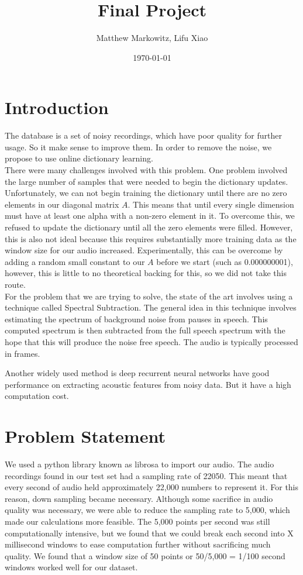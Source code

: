 \documentclass[UTF8]{article}
\title{Final Project}
\author{Matthew Markowitz, Lifu Xiao}
\date{\today}
\begin{document}
\maketitle


\section{Introduction}
The database is a set of noisy recordings, which have poor quality for further usage. So it make sense  to improve them. In order to remove the noise, we propose to use online dictionary learning.\\

There were many challenges involved with this problem. One problem involved the large number of samples that were needed to begin the dictionary updates. Unfortunately, we can not begin training the dictionary until there are no zero elements in our diagonal matrix $A$. This means that until every single dimension must have at least one alpha with a non-zero element in it. To overcome this, we refused to update the dictionary until all the zero elements were filled. However, this is also not ideal because this requires substantially more training data as the window size for our audio increased. Experimentally, this can be overcome by adding a random small constant to our $A$ before we start (such as 0.000000001), however, this is little to no theoretical backing for this, so we did not take this route.\\

For the problem that we are trying to solve, the state of the art involves using a technique called Spectral Subtraction\cite{upadhyay2015speech}. The general idea in this technique involves estimating the spectrum of background noise from pauses in speech. This computed spectrum is then subtracted from the full speech spectrum with the hope that this will produce the noise free speech. The audio is typically processed in frames.

Another widely used method is deep recurrent neural networks\cite{valentini2016speech} have good performance on extracting acoustic features from noisy data. But it have a high computation cost.

\section{Problem Statement}
We used a python library known as librosa to import our audio\cite{valentini2017noisy}. The audio recordings found in our test set had a sampling rate of 22050. This meant that every second of audio held approximately 22,000 numbers to represent it. For this reason, down sampling became necessary. Although some sacrifice in audio quality was necessary, we were able to reduce the sampling rate to 5,000, which made our calculations more feasible. The 5,000 points per second was still computationally intensive, but we found that we could break each second into X millisecond windows to ease computation further without sacrificing much quality. We found that a window size of 50 points or 50/5,000 = 1/100 second windows worked well for our dataset.
\end{document}
